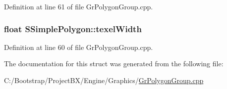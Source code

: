 Definition at line 61 of file GrPolygonGroup.cpp.\hypertarget{struct_s_simple_polygon_fd206b6c754d78d5bdab7f57726d3cb3}{
\subsubsection[{texelWidth}]{\setlength{\rightskip}{0pt plus 5cm}float {\bf SSimplePolygon::texelWidth}}}
\label{struct_s_simple_polygon_fd206b6c754d78d5bdab7f57726d3cb3}




Definition at line 60 of file GrPolygonGroup.cpp.

The documentation for this struct was generated from the following file:\begin{CompactItemize}
\item 
C:/Bootstrap/ProjectBX/Engine/Graphics/\hyperlink{_gr_polygon_group_8cpp}{GrPolygonGroup.cpp}\end{CompactItemize}
